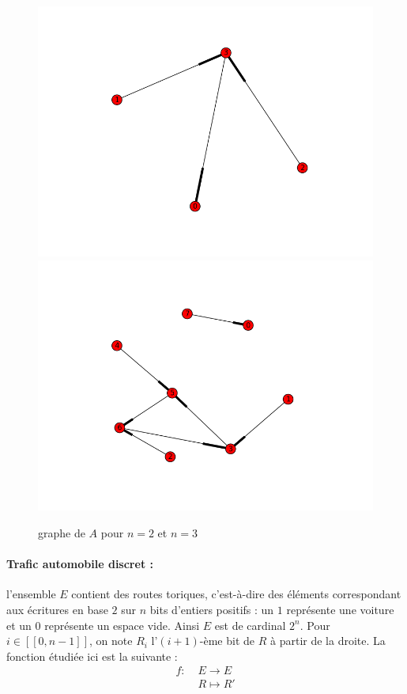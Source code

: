 \begin{figure}[!]
\begin{center}
\includegraphics[scale=0.5]{./images/figure_1.PNG}\\
\includegraphics[scale=0.5]{./images/figure_2.PNG}
\end{center}
\caption{graphe de $A$ pour $n=2$ et $n=3$}
\end{figure}



\paragraph{\og Trafic automobile discret\fg{} :} l'ensemble $E$ contient des \og routes \fg{} toriques, c'est-\`a-dire des \'el\'ements correspondant aux \'ecritures en base $2$ sur $n$ bits d'entiers positifs : un $1$ repr\'esente une voiture et un $0$ repr\'esente un espace vide. Ainsi $E$ est de cardinal $2^n$. Pour $i\in [\![0,n-1]\!]$, on note $R_i$ l'$(i+1)$-\`eme bit de $R$ \`a partir de la droite. La fonction \'etudi\'ee ici est la suivante : 
\[\begin{aligned}f:\;&E\rightarrow E\\&R\mapsto R'\end{aligned}\]

